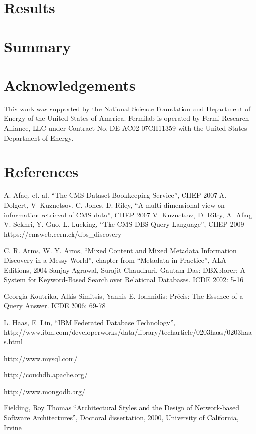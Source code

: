 \documentclass[a4paper]{jpconf}
\begin{document}
\section{Results\label{Results}}

\section{Summary}

\section{Acknowledgements}

This work was supported by the National Science Foundation and Department of Energy of the United States of America. Fermilab is operated by Fermi Research Alliance, LLC under Contract
No. DE-AC02-07CH11359 with the United States Department of Energy.

\section*{References}
\begin{thebibliography}{9}
 A. Afaq, et. al. ``The CMS Dataset Bookkeeping Service'', CHEP 2007 
 A. Dolgert, V. Kuznetsov, C. Jones, D. Riley, 
``A multi-dimensional view on information retrieval of CMS data'', CHEP 2007
 V. Kuznetsov, D. Riley, A. Afaq, V. Sekhri, Y. Guo, L. Lueking,
``The CMS DBS Query Language'', CHEP 2009
 https://cmsweb.cern.ch/dbs\_discovery

C. R. Arms, W. Y. Arms, ``Mixed Content and Mixed Metadata 
Information Discovery in a Messy World'',
chapter from ``Metadata in Practice'', ALA Editions, 2004
Sanjay Agrawal, Surajit Chaudhuri, Gautam Das: DBXplorer: A System for
Keyword-Based Search over Relational Databases. ICDE 2002: 5-16

Georgia Koutrika, Alkis Simitsis, Yannis E. Ioannidis: Pr\'{e}cis: The Essence of
a Query Answer. ICDE 2006: 69-78

L. Haas, E. Lin,
``IBM Federated Database Technology'', \\
http://www.ibm.com/developerworks/data/library/techarticle/0203haas/0203haas.html

http://www.mysql.com/

http://couchdb.apache.org/

http://www.mongodb.org/

Fielding, Roy Thomas ``Architectural Styles and the Design of 
Network-based Software Architectures'', Doctoral dissertation, 2000,
University of California, Irvine

\end{thebibliography}
\end{document}
